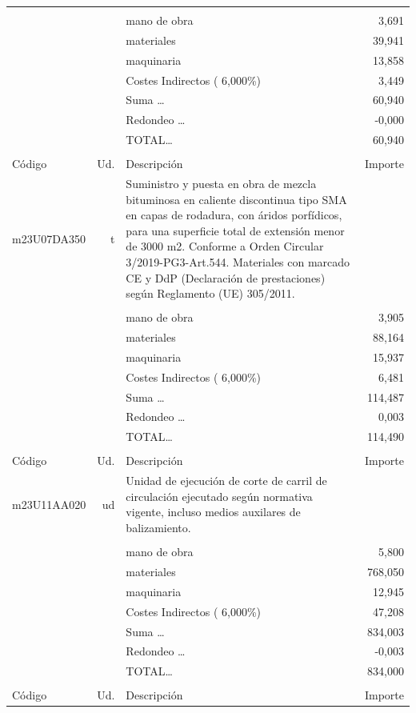 \begin{supertabular}{l r p{60mm} r}
&&&\\%
&&mano de obra&     3,691\\%
&&materiales&    39,941\\%
&&maquinaria&    13,858\\%
&&Costes Indirectos (     6,000\%)&     3,449\\%
&&Suma \ldots&    60,940\\%
&&Redondeo \ldots&    {-}0,000\\%
%
&&TOTAL\ldots&    60,940\\%
&&&\\%
Código&Ud.&Descripción&Importe\\%
\hline%
m23U07DA350&t&Suministro y puesta en obra de mezcla bituminosa en caliente discontinua tipo SMA en capas de rodadura, con áridos porfídicos, para una superficie total de extensión menor de 3000 m2. Conforme a Orden Circular 3/2019{-}PG3{-}Art.544. Materiales con marcado CE y DdP (Declaración de prestaciones) según Reglamento (UE) 305/2011.&\\%
&&&\\%
&&mano de obra&     3,905\\%
&&materiales&    88,164\\%
&&maquinaria&    15,937\\%
&&Costes Indirectos (     6,000\%)&     6,481\\%
&&Suma \ldots&   114,487\\%
&&Redondeo \ldots&     0,003\\%
%
&&TOTAL\ldots&   114,490\\%
&&&\\%
Código&Ud.&Descripción&Importe\\%
\hline%
m23U11AA020&ud&Unidad de ejecución de corte de carril de circulación ejecutado según normativa vigente, incluso medios auxilares de balizamiento.&\\%
&&&\\%
&&mano de obra&     5,800\\%
&&materiales&   768,050\\%
&&maquinaria&    12,945\\%
&&Costes Indirectos (     6,000\%)&    47,208\\%
&&Suma \ldots&   834,003\\%
&&Redondeo \ldots&    {-}0,003\\%
%
&&TOTAL\ldots&   834,000\\%
&&&\\%
Código&Ud.&Descripción&Importe\\%

\end{supertabular}
